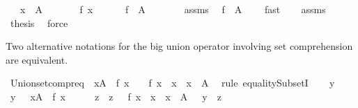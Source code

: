 \begin{isabellebody}
\ \ \ {\isachardoublequoteopen}x\ {\isasymin}\ A{\isachardoublequoteclose}\isanewline
\ \ \ \ \ \ \ {\isachardoublequoteopen}f\ x\ {\isasymnoteq}\ {\isacharbraceleft}{\isacharbraceright}{\isachardoublequoteclose}\isanewline
\ \ \ {\isachardoublequoteopen}{\isasymUnion}\ {\isacharparenleft}f\ {\isacharbackquote}\ A{\isacharparenright}\ {\isasymnoteq}\ {\isacharbraceleft}{\isacharbraceright}{\isachardoublequoteclose}\isanewline
%
\isadelimproof
%
\endisadelimproof
%
\isatagproof
{}\isamarkupfalse%
\ {\isacharminus}\isanewline
\ \ \isamarkupfalse%
\ assms{\isacharparenleft}{}{\isacharparenright}\ \isamarkupfalse%
\ {\isachardoublequoteopen}f\ {\isacharbackquote}\ A\ {\isasymnoteq}\ {\isacharbraceleft}{\isacharbraceright}{\isachardoublequoteclose}\ \isamarkupfalse%
\ fast\isanewline
\ \ \isamarkupfalse%
\ assms\ \isamarkupfalse%
\ {\isacharquery}thesis\ \isamarkupfalse%
\ force\isanewline
{}\isamarkupfalse%
%
\endisatagproof
{\isafoldproof}%
%
\isadelimproof
%
\endisadelimproof
%
\begin{isamarkuptext}%
Two alternative notations for the big union operator involving set comprehension are
  equivalent.%
\end{isamarkuptext}%
\isamarkuptrue%
\isamarkupfalse%
\ Union{\isacharunderscore}set{\isacharunderscore}compr{\isacharunderscore}eq{\isacharcolon}\ {\isachardoublequoteopen}{\isacharparenleft}{\isasymUnion}\ x{\isasymin}A\ {\isachardot}\ f\ x{\isacharparenright}\ {\isacharequal}\ {\isasymUnion}\ {\isacharbraceleft}\ f\ x\ {\isacharbar}\ x\ {\isachardot}\ x\ {\isasymin}\ A\ {\isacharbraceright}{\isachardoublequoteclose}\isanewline
%
\isadelimproof
%
\endisadelimproof
%
\isatagproof
{}\isamarkupfalse%
\ {\isacharparenleft}rule\ equalitySubsetI{\isacharparenright}\isanewline
\ \ \isamarkupfalse%
\ y\isanewline
\ \ \isamarkupfalse%
\ {\isachardoublequoteopen}y\ {\isasymin}\ {\isacharparenleft}{\isasymUnion}\ x{\isasymin}A\ {\isachardot}\ f\ x{\isacharparenright}{\isachardoublequoteclose}\isanewline
\ \ \isamarkupfalse%
\ \isamarkupfalse%
\ z\ \ {\isachardoublequoteopen}z\ {\isasymin}\ {\isacharbraceleft}\ f\ x\ {\isacharbar}\ x\ {\isachardot}\ x\ {\isasymin}\ A\ {\isacharbraceright}{\isachardoublequoteclose}\ \ {\isachardoublequoteopen}y\ {\isasymin}\ z{\isachardoublequoteclose}\ \isamarkupfalse%

\end{isabellebody}
